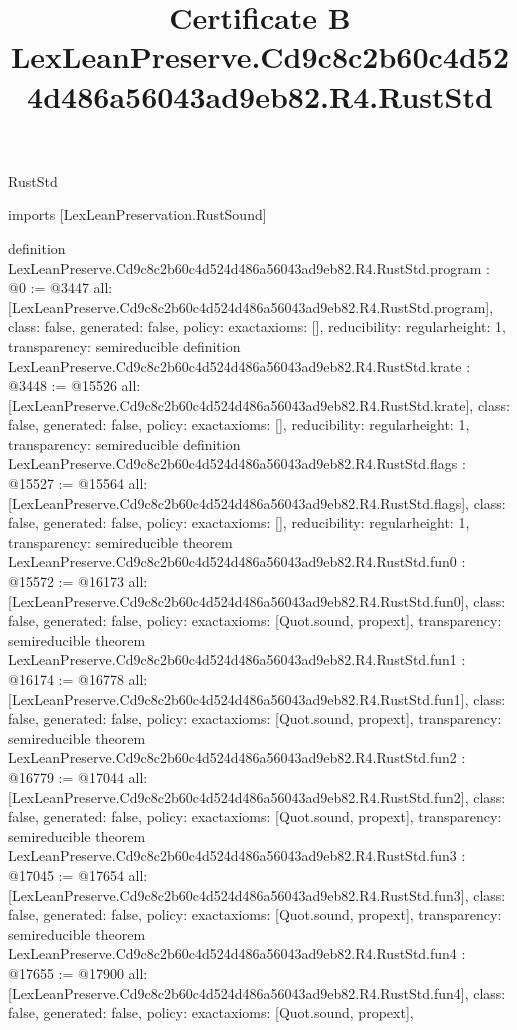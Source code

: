 \begin{lexlean}{RustStd}
\title{Certificate B LexLeanPreserve.Cd9c8c2b60c4d524d486a56043ad9eb82.R4.RustStd}
\begin{coremodule}
imports [LexLeanPreservation.RustSound]

definition LexLeanPreserve.Cd9c8c2b60c4d524d486a56043ad9eb82.R4.RustStd.program : @0 := @3447 {
  all: [LexLeanPreserve.Cd9c8c2b60c4d524d486a56043ad9eb82.R4.RustStd.program],
  class: false,
  generated: false,
  policy: exact{axioms: []},
  reducibility: regular{height: 1},
  transparency: semireducible
}
definition LexLeanPreserve.Cd9c8c2b60c4d524d486a56043ad9eb82.R4.RustStd.krate : @3448 := @15526 {
  all: [LexLeanPreserve.Cd9c8c2b60c4d524d486a56043ad9eb82.R4.RustStd.krate],
  class: false,
  generated: false,
  policy: exact{axioms: []},
  reducibility: regular{height: 1},
  transparency: semireducible
}
definition LexLeanPreserve.Cd9c8c2b60c4d524d486a56043ad9eb82.R4.RustStd.flags : @15527 := @15564 {
  all: [LexLeanPreserve.Cd9c8c2b60c4d524d486a56043ad9eb82.R4.RustStd.flags],
  class: false,
  generated: false,
  policy: exact{axioms: []},
  reducibility: regular{height: 1},
  transparency: semireducible
}
theorem LexLeanPreserve.Cd9c8c2b60c4d524d486a56043ad9eb82.R4.RustStd.fun0 : @15572 := @16173 {
  all: [LexLeanPreserve.Cd9c8c2b60c4d524d486a56043ad9eb82.R4.RustStd.fun0],
  class: false,
  generated: false,
  policy: exact{axioms: [Quot.sound, propext]},
  transparency: semireducible
}
theorem LexLeanPreserve.Cd9c8c2b60c4d524d486a56043ad9eb82.R4.RustStd.fun1 : @16174 := @16778 {
  all: [LexLeanPreserve.Cd9c8c2b60c4d524d486a56043ad9eb82.R4.RustStd.fun1],
  class: false,
  generated: false,
  policy: exact{axioms: [Quot.sound, propext]},
  transparency: semireducible
}
theorem LexLeanPreserve.Cd9c8c2b60c4d524d486a56043ad9eb82.R4.RustStd.fun2 : @16779 := @17044 {
  all: [LexLeanPreserve.Cd9c8c2b60c4d524d486a56043ad9eb82.R4.RustStd.fun2],
  class: false,
  generated: false,
  policy: exact{axioms: [Quot.sound, propext]},
  transparency: semireducible
}
theorem LexLeanPreserve.Cd9c8c2b60c4d524d486a56043ad9eb82.R4.RustStd.fun3 : @17045 := @17654 {
  all: [LexLeanPreserve.Cd9c8c2b60c4d524d486a56043ad9eb82.R4.RustStd.fun3],
  class: false,
  generated: false,
  policy: exact{axioms: [Quot.sound, propext]},
  transparency: semireducible
}
theorem LexLeanPreserve.Cd9c8c2b60c4d524d486a56043ad9eb82.R4.RustStd.fun4 : @17655 := @17900 {
  all: [LexLeanPreserve.Cd9c8c2b60c4d524d486a56043ad9eb82.R4.RustStd.fun4],
  class: false,
  generated: false,
  policy: exact{axioms: [Quot.sound, propext]},
}
\end{coremodule}
\end{lexlean}
